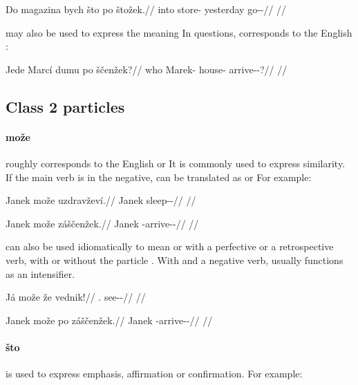 \pex
\begingl
	\gla Do magazina bych što po štožek.//
	\glb into store-\Acc{} yesterday \Aff{} \Ipfv{} go-\Av{}-\Pf{}//
	\glft {}//
\endgl
\xe

 may also be used to express the meaning  In
questions,  corresponds to the English :

\pex
\begingl
	\gla Jede Marcí dumu po ščenžek?//
	\glb who Marek-\Gen{} house-\Ins{} \Ipfv{} arrive-\Av{}-\Pf{}?//
	\glft {}//
\endgl
\xe

\subsection{Class 2 particles}\label{sec:class2-particles}

\paragraph{može}  roughly corresponds to the English  or
 It is commonly used to express similarity. If the main verb is in
the negative,  can be translated as  or 
For example:

\pex
\begingl
	\gla Janek može uzdravževí.//
	\glb Janek \Add{} sleep-\Av{}-\Cont{}//
	\glft {}//
\endgl
\xe

\pex
\begingl
	\gla Janek može záščenžek.//
	\glb Janek \Add{} \Neg{}-arrive-\Av{}-\Pf{}//
	\glft {}//
\endgl
\xe

 can also be used idiomatically to mean  or  with a perfective or a retrospective verb, with or without the particle
. With  and a negative verb,  usually functions as an
intensifier. 

\pex
\begingl
	\gla Já može že vednik!//
	\glb \Second{}.\Sg{} \Add{} \Ipfv{} see-\Pv{}-\Pf{}//
	\glft {}//
\endgl
\xe

\pex
\begingl
	\gla Janek može po záščenžek.//
	\glb Janek \Add{} \Ipfv{} \Neg{}-arrive-\Av{}-\Pf{}//
	\glft {}//
\endgl
\xe


\paragraph{što}  is used to express emphasis, affirmation or confirmation. For example:

